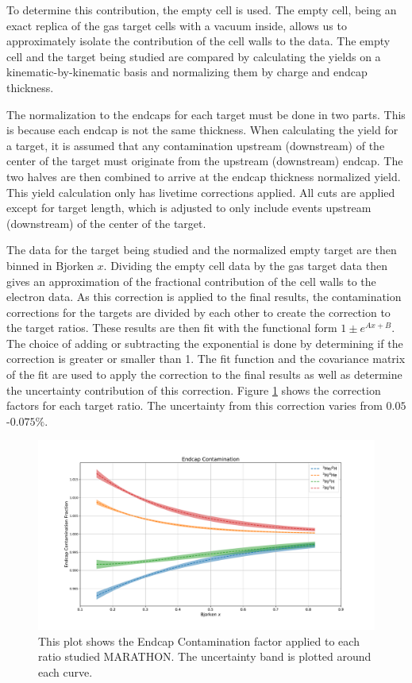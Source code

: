 To determine this contribution, the empty cell is used. The empty cell, being an exact replica of the gas target cells with a vacuum inside, allows us to approximately isolate the contribution of the cell walls to the data. The empty cell and the target being studied are compared by calculating the yields on a kinematic-by-kinematic basis and normalizing them by charge and endcap thickness.

The normalization to the endcaps for each target must be done in two parts. This is because each endcap is not the same thickness. When calculating the yield for a target, it is assumed that any contamination upstream (downstream) of the center of the target must originate from the upstream (downstream) endcap. The two halves are then combined to arrive at the endcap thickness normalized yield. This yield calculation only has livetime corrections applied. All cuts are applied except for target length, which is adjusted to only include events upstream (downstream) of the center of the target.

The data for the target being studied and the normalized empty target are then binned in Bjorken $x$. Dividing the empty cell data by the gas target data then gives an approximation of the fractional contribution of the cell walls to the electron data. As this correction is applied to the final results, the contamination corrections for the targets are divided by each other to create the correction to the target ratios. These results are then fit with the functional form $1\pm e^{Ax+B}$. The choice of adding or subtracting the exponential is done by determining if the correction is greater or smaller than 1. The fit function and the covariance matrix of the fit are used to apply the correction to the final results as well as determine the uncertainty contribution of this correction. Figure \ref{fig:ECC} shows the correction factors for each target ratio. The uncertainty from this correction varies from $0.05$-$0.075\%$.

\begin{figure}
	\includegraphics[width=\textwidth]{./analysis/fig/ECC.pdf}
	\caption{This plot shows the Endcap Contamination factor applied to each ratio studied MARATHON. The uncertainty band is plotted around each curve.}
	\label{fig:ECC}
\end{figure}

